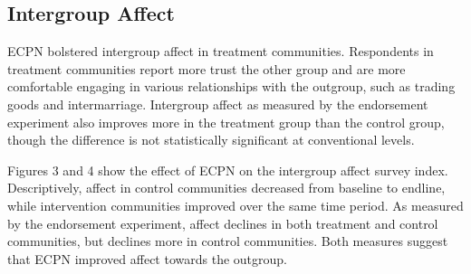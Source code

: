 \documentclass[11pt]{article}
\begin{document}
\begin{figure}[!h]
\begin{minipage}[b]{.48\textwidth}
        \label{fig:fig2}
    \end{minipage}
\end{figure}

\hypertarget{intergroup-affect}{%
\subsection{Intergroup Affect}\label{intergroup-affect}}

ECPN bolstered intergroup affect in treatment communities. Respondents
in treatment communities report more trust the other group and are more
comfortable engaging in various relationships with the outgroup, such as
trading goods and intermarriage. Intergroup affect as measured by the
endorsement experiment also improves more in the treatment group than
the control group, though the difference is not statistically
significant at conventional levels.

Figures 3 and 4 show the effect of ECPN on the intergroup affect survey
index. Descriptively, affect in control communities decreased from
baseline to endline, while intervention communities improved over the
same time period. As measured by the endorsement experiment, affect
declines in both treatment and control communities, but declines more in
control communities. Both measures suggest that ECPN improved affect
towards the outgroup.
\end{document}
